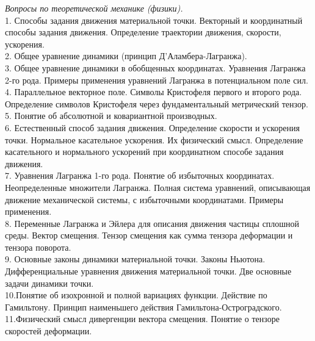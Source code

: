 \documentclass[a4paper, 12pt]{report}
\begin{document}
  \emph{Вопросы по теоретической механике (физики).}\\

	1. Способы задания движения материальной точки. Векторный и
	координатный способы задания движения. Определение траектории
	движения, скорости, ускорения.\\

	2. Общее уравнение динамики (принцип Д'Аламбера-Лагранжа).\\

	3. Общее уравнение динамики в обобщенных координатах. Уравнения
	Лагранжа 2-го рода. Примеры применения уравнений Лагранжа в
	потенциальном поле сил.\\

	4. Параллельное векторное поле. Символы Кристофеля первого и второго
	рода. Определение символов Кристофеля через фундаментальный
	метрический тензор.\\

	5. Понятие об абсолютной и ковариантной производных.\\

	6. Естественный способ задания движения. Определение скорости и
	ускорения точки. Нормальное касательное ускорения. Их физический
	смысл. Определение касательного и нормального ускорений при
	координатном способе задания движения.\\

	7. Уравнения Лагранжа 1-го рода. Понятие об избыточных координатах.
	Неопределенные множители Лагранжа. Полная система уравнений,
	описывающая движение механической системы, с избыточными
	координатами. Примеры применения.\\

	8. Переменные Лагранжа и Эйлера для описания движения частицы
	сплошной среды. Вектор смещения. Тензор смещения как сумма
	тензора деформации и тензора поворота.\\

	9. Основные законы динамики материальной точки. Законы Ньютона.
	Дифференциальные уравнения движения материальной точки. Две
	основные задачи динамики точки.\\

	10.Понятие об изохронной и полной вариациях функции. Действие по 
	Гамильтону. Принцип наименьшего действия Гамильтона-Остроградского.\\

	11.Физический смысл дивергенции вектора смещения. Понятие о тензоре
	скоростей деформации.\\
\end{document}
